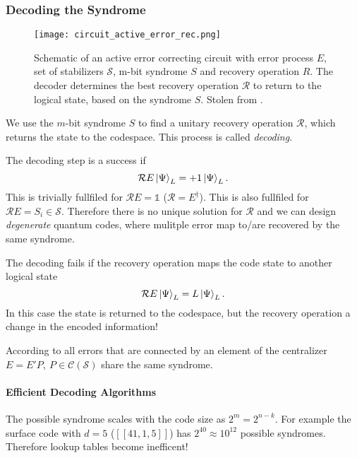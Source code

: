 \subsubsection{Decoding the Syndrome}
\begin{figure}[h]
    \begin{center}
        \texttt{[image: circuit\_active\_error\_rec.png]}
    \end{center}
    \caption{
    Schematic of an active error correcting circuit with error process $E$, set of stabilizers $\mathcal{S}$, m-bit syndrome $S$ and recovery operation $R$.
    The decoder determines the best recovery operation $\mathcal{R}$ to return to the logical state, based on the syndrome $S$.
    Stolen from \cite{QECintro}.
    }
    \label{fig:basic.qc.qec_circuit}
\end{figure}
We use the $m$-bit syndrome $S$ to find a unitary recovery operation $\mathcal{R}$, 
which returns the state to the codespace.
This process is called \textit{decoding}.

The decoding step is a success if 
\begin{equation}
    \mathcal{R}E \ket{\Psi}_L = +1 \ket{\Psi}_L.
\end{equation}
This is trivially fullfiled for $\mathcal{R}E=\mathds{1}$ ($\mathcal{R}=E^\dagger$). 
This is also fullfiled for $\mathcal{R}E=S_i \in \mathcal{S}$.
Therefore there is no unique solution for $\mathcal{R}$ and we can design \textit{degenerate} quantum codes,
where mulitple error map to/are recovered by the same syndrome. \cite{QECintro}

The decoding fails if the recovery operation maps the code state to another logical state
\begin{equation}
    \mathcal{R}E \ket{\Psi}_L = L\ket{\Psi}_L.
\end{equation}
In this case the state is returned to the codespace, 
but the recovery operation a change in the encoded information! \cite{QECintro}

According to \cite{QECmemory} all errors that are connected by an element of the centralizer $E=E'P,\ P \in \mathcal{C}(\mathcal{S})$ share the same syndrome.

\paragraph{Efficient Decoding Algorithms}
The possible syndrome scales with the code size as $2^m = 2^{n-k}$.
For example the surface code with $d=5$ ($[[41,1,5]]$) has $2^{40}\approx 10^{12}$ possible syndromes. 
Therefore lookup tables become inefficent! \cite{QECintro}

